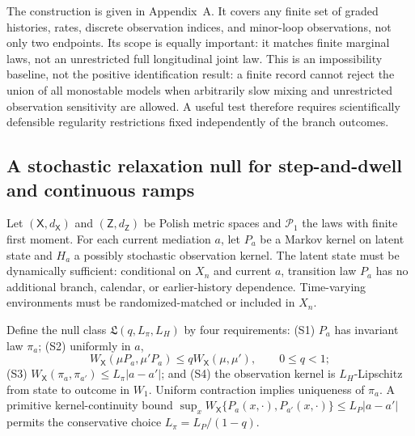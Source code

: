 \documentclass[pdflatex,sn-mathphys-num]{sn-jnl}
\begin{document}
The construction is given in Appendix~A. It covers any finite set of graded histories, rates, discrete observation indices, and minor-loop observations, not only two endpoints. Its scope is equally important: it matches finite marginal laws, not an unrestricted full longitudinal joint law. This is an impossibility baseline, not the positive identification result: a finite record cannot reject the union of all monostable models when arbitrarily slow mixing and unrestricted observation sensitivity are allowed. A useful test therefore requires scientifically defensible regularity restrictions fixed independently of the branch outcomes.

\subsection{A stochastic relaxation null for step-and-dwell and continuous ramps}

Let $(\mathsf X,d_{\mathsf X})$ and $(\mathsf Z,d_{\mathsf Z})$ be Polish metric spaces and $\mathcal P_1$ the laws with finite first moment. For each current mediation $a$, let $P_a$ be a Markov kernel on latent state and $H_a$ a possibly stochastic observation kernel. The latent state must be dynamically sufficient: conditional on $X_n$ and current $a$, transition law $P_a$ has no additional branch, calendar, or earlier-history dependence. Time-varying environments must be randomized-matched or included in $X_n$.

Define the null class $\mathfrak L(q,L_\pi,L_H)$ by four requirements: (S1) $P_a$ has invariant law $\pi_a$; (S2) uniformly in $a$,
\begin{equation}
W_{\mathsf X}(\mu P_a,\mu'P_a)\leq qW_{\mathsf X}(\mu,\mu'),\qquad 0\leq q<1;
\label{eq:wasserstein-contraction}
\end{equation}
(S3) $W_{\mathsf X}(\pi_a,\pi_{a'})\leq L_\pi|a-a'|$; and (S4) the observation kernel is $L_H$-Lipschitz from state to outcome in $W_1$. Uniform contraction implies uniqueness of $\pi_a$. A primitive kernel-continuity bound $\sup_xW_{\mathsf X}\{P_a(x,\cdot),P_{a'}(x,\cdot)\}\leq L_P|a-a'|$ permits the conservative choice $L_\pi=L_P/(1-q)$.
\end{document}

